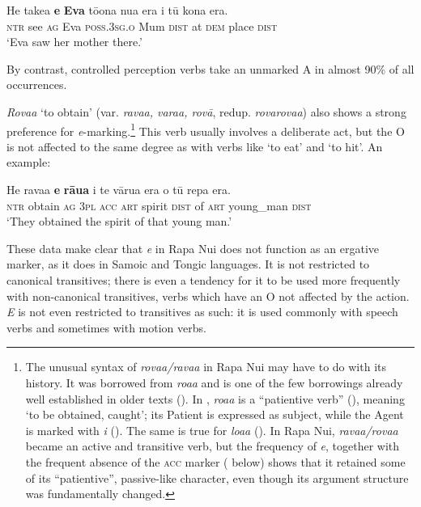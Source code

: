 \ea\label{ex:8.15}
\gll He take{\ꞌ}a \textbf{e} \textbf{Eva} tō{\ꞌ}ona nua era {\ꞌ}i tū kona era.\\
\textsc{ntr} see \textsc{ag} Eva \textsc{poss.3sg.o} Mum \textsc{dist} at \textsc{dem} place \textsc{dist}\\

\glt
‘Eva saw her mother there.’ \textstyleExampleref{[R210.086]} 
\z

By contrast, controlled perception verbs take an unmarked A in almost 90\% of all occurrences.

\textit{Rova{\ꞌ}a} ‘to obtain’ (var. \textit{rava{\ꞌ}a, vara{\ꞌ}a, rovā}, redup. \textit{rovarova{\ꞌ}a}) also shows a strong preference for \textit{e}{}-marking.\footnote{\label{fn:398}The unusual syntax of \textit{rova{\ꞌ}a/rava{\ꞌ}a} in Rapa Nui may have to do with its history. It was borrowed from  \textit{roa{\ꞌ}a} and is one of the few borrowings already well established in older texts (). In , \textit{roa{\ꞌ}a} is a “patientive verb” (\citealt[241]{LazardPeltzer2000}), meaning ‘to be obtained, caught’; its Patient is expressed as subject, while the Agent is marked with  \textit{i} (). The same is true for  \textit{loa{\ꞌ}a} (\citealt[50]{ElbertPukui1979}). In Rapa Nui, \textit{rava{\ꞌ}a/rova{\ꞌ}a} became an active and transitive verb, but the frequency of  \textit{e}, together with the frequent absence of the \textsc{acc} marker ( below) shows that it retained some of its “patientive”, passive-like character, even though its argument structure was fundamentally changed.} This verb usually involves a deliberate act, but the O is not affected to the same degree as with verbs like ‘to eat’ and ‘to hit’. An example:

\ea\label{ex:8.16}
\gll He rava{\ꞌ}a \textbf{e} \textbf{rāua} i te vārua era o tū repa era.\\
\textsc{ntr} obtain \textsc{ag} \textsc{3pl} \textsc{acc} \textsc{art} spirit \textsc{dist} of \textsc{art} young\_man \textsc{dist}\\

\glt 
‘They obtained the spirit of that young man.’ \textstyleExampleref{[R310.319]} 
\z

These data make clear that \textit{e} in Rapa Nui does not function as an ergative marker, as it does in Samoic and Tongic languages. It is not restricted to canonical transitives; there is even a tendency for it to be used more frequently with non-canonical transitives, verbs which have an O not affected by the action. \textit{E} is not even restricted to transitives as such: it is used commonly with speech verbs and sometimes with motion verbs.

